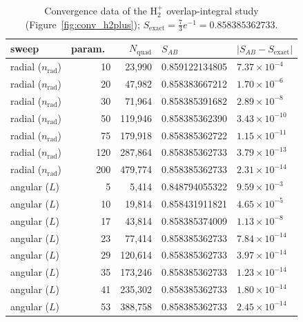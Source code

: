 \begin{table}[H]
  \centering\small
  \begin{tabular}{@{}lrrll@{}}
    \toprule
    sweep & param.\ & $N_\mathrm{quad}$ & $S_{AB}$ & $|S_{AB}-S_\mathrm{exact}|$ \\
    \midrule
    radial ($n_\mathrm{rad}$) & 10 & 23,990 & 0.859122134805 & $7.37\times10^{-4}$ \\
    radial ($n_\mathrm{rad}$) & 20 & 47,982 & 0.858383667212 & $1.70\times10^{-6}$ \\
    radial ($n_\mathrm{rad}$) & 30 & 71,964 & 0.858385391682 & $2.89\times10^{-8}$ \\
    radial ($n_\mathrm{rad}$) & 50 & 119,946 & 0.858385362390 & $3.43\times10^{-10}$ \\
    radial ($n_\mathrm{rad}$) & 75 & 179,918 & 0.858385362722 & $1.15\times10^{-11}$ \\
    radial ($n_\mathrm{rad}$) & 120 & 287,864 & 0.858385362733 & $3.79\times10^{-13}$ \\
    radial ($n_\mathrm{rad}$) & 200 & 479,774 & 0.858385362733 & $2.31\times10^{-14}$ \\
    \midrule
    angular ($L$) & 5 & 5,414 & 0.848794055322 & $9.59\times10^{-3}$ \\
    angular ($L$) & 10 & 19,814 & 0.858431911821 & $4.65\times10^{-5}$ \\
    angular ($L$) & 17 & 43,814 & 0.858385374009 & $1.13\times10^{-8}$ \\
    angular ($L$) & 23 & 77,414 & 0.858385362733 & $7.84\times10^{-14}$ \\
    angular ($L$) & 29 & 120,614 & 0.858385362733 & $3.97\times10^{-14}$ \\
    angular ($L$) & 35 & 173,246 & 0.858385362733 & $1.23\times10^{-14}$ \\
    angular ($L$) & 41 & 235,302 & 0.858385362733 & $1.80\times10^{-14}$ \\
    angular ($L$) & 53 & 388,758 & 0.858385362733 & $2.45\times10^{-14}$ \\
    \bottomrule
  \end{tabular}
  \caption{Convergence data of the H$_2^+$ overlap-integral study (Figure~\ref{fig:conv_h2plus}); $S_\mathrm{exact}=\frac{7}{3}e^{-1}=0.858385362733$.}
  \label{tab:data_h2plus}
\end{table}
